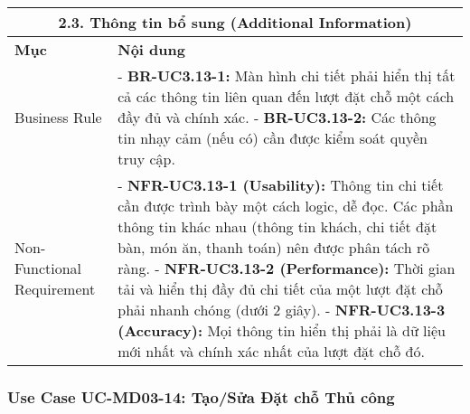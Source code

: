 \begin{longtable}{|m{4cm}|p{11cm}|}
\hline
\multicolumn{2}{|c|}{\textbf{2.3. Thông tin bổ sung (Additional Information)}} \\
\hline
\textbf{Mục} & \textbf{Nội dung} \\
\hline
Business Rule & - \textbf{BR-UC3.13-1:} Màn hình chi tiết phải hiển thị tất cả các thông tin liên quan đến lượt đặt chỗ một cách đầy đủ và chính xác. \newline - \textbf{BR-UC3.13-2:} Các thông tin nhạy cảm (nếu có) cần được kiểm soát quyền truy cập. \\
\hline
Non-Functional Requirement & - \textbf{NFR-UC3.13-1 (Usability):} Thông tin chi tiết cần được trình bày một cách logic, dễ đọc. Các phần thông tin khác nhau (thông tin khách, chi tiết đặt bàn, món ăn, thanh toán) nên được phân tách rõ ràng. \newline - \textbf{NFR-UC3.13-2 (Performance):} Thời gian tải và hiển thị đầy đủ chi tiết của một lượt đặt chỗ phải nhanh chóng (dưới 2 giây). \newline - \textbf{NFR-UC3.13-3 (Accuracy):} Mọi thông tin hiển thị phải là dữ liệu mới nhất và chính xác nhất của lượt đặt chỗ đó. \\
\hline
\end{longtable}

\subsubsection{Use Case UC-MD03-14: Tạo/Sửa Đặt chỗ Thủ công}

